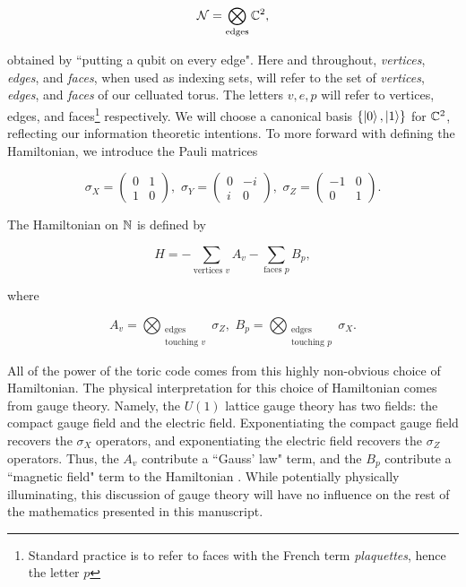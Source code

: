 \documentclass{article}
\theoremstyle{definition}
\numberwithin{figure}{section}
\begin{document}
$$\mathcal{N}=\bigotimes_{\text{edges}}\mathbb{C}^2,$$

obtained by ``putting a qubit on every edge". Here and throughout, \textit{vertices}, \textit{edges}, and \textit{faces}, when used as indexing sets, will refer to the set of \textit{vertices}, \textit{edges}, and \textit{faces} of our celluated torus. The letters $v,e,p$ will refer to vertices, edges, and faces\footnote{Standard practice is to refer to faces with the French term \textit{plaquettes}, hence the letter $p$} respectively. We will choose a canonical basis $\left\{\left|0\right>,\left|1\right>\right\}$ for $\mathbb{C}^2$, reflecting our information theoretic intentions. To more forward with defining the Hamiltonian, we introduce the Pauli matrices

$$
\sigma_X=
\begin{pmatrix}
0 & 1\\
1 & 0
\end{pmatrix},\,\,
\sigma_Y=
\begin{pmatrix}
0 & -i\\
i & 0
\end{pmatrix},\,\,
\sigma_Z=
\begin{pmatrix}
-1 & 0\\
0 & 1
\end{pmatrix}.
$$

The Hamiltonian on $\mathbb{N}$ is defined by

$$H=-\sum_{\text{vertices } v}A_v-\sum_{\text{faces } p}B_p,$$

where

$$A_v=\bigotimes_{\substack{\text{edges}\\ \text{touching }v}}\sigma_Z,\,\, B_p=\bigotimes_{\substack{\text{edges}\\ \text{touching }p}}\sigma_X.$$

All of the power of the toric code comes from this highly non-obvious choice of Hamiltonian. The physical interpretation for this choice of Hamiltonian comes from gauge theory. Namely, the $U(1)$ lattice gauge theory has two fields: the compact gauge field and the electric field. Exponentiating the compact gauge field recovers the $\sigma_X$ operators, and exponentiating the electric field recovers the $\sigma_Z$ operators. Thus, the $A_v$ contribute a ``Gauss' law" term, and the $B_p$ contribute a ``magnetic field" term to the Hamiltonian \cite{oh2022rank}. While potentially physically illuminating, this discussion of gauge theory will have no influence on the rest of the mathematics presented in this manuscript.
\end{document}
